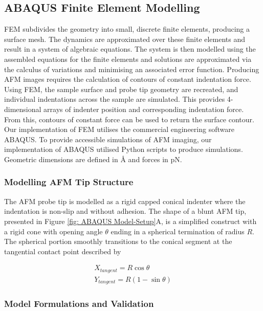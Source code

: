 \subsection{ABAQUS Finite Element Modelling}

FEM subdivides the geometry into small, discrete finite elements, producing a surface mesh. The dynamics are approximated over these finite elements and result in a system of algebraic equations. The system is then modelled using the assembled equations for the finite elements and solutions are approximated via the calculus of variations and minimising an associated error function. Producing AFM images requires the calculation of contours of constant indentation force. Using FEM, the sample surface and probe tip geometry are recreated, and individual indentations across the sample are simulated. This provides 4-dimensional arrays of indenter position and corresponding indentation force. From this, contours of constant force can be used to return the surface contour. Our implementation of FEM utilises the commercial engineering software ABAQUS. To provide accessible simulations of AFM imaging, our implementation of ABAQUS utilised Python scripts to produce simulations. Geometric dimensions are defined in $\text{\AA}$ and forces in $\text{pN}$.

\subsubsection{Modelling AFM Tip Structure}

The AFM probe tip is modelled as a rigid capped conical indenter where the indentation is non-slip and without adhesion. The shape of a blunt AFM tip, presented in Figure \ref{fig: ABAQUS Model-Setup}A, is a simplified construct with a rigid cone with opening angle $\theta$ ending in a spherical termination of radius $R$. The spherical portion smoothly transitions to the conical segment at the tangential contact point described by

\begin{equation}\label{eq: AFM Tip}
\begin{split}
    X_{tangent} = R\cos\theta 
    \\
    Y_{tangent} = R(1-\sin\theta) 
\end{split}
\end{equation}

\subsubsection{Model Formulations and Validation}

